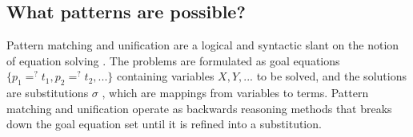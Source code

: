 \documentclass[sigconf]{acmart}
\begin{document}
 
 

















\subsection{What patterns are possible?} \label{patternpossible}

Pattern matching and unification are a logical and syntactic slant on the notion of equation solving \cite{traatbook} \cite{BAADER2001445}. The problems are formulated as goal equations $\{p_1 =^? t_1, p_2 =^? t_2, ...\}$ containing variables $X, Y,...$ to be solved, and the solutions are substitutions $\sigma$ , which are mappings from variables to terms. Pattern matching and unification operate as backwards reasoning methods that breaks down the goal equation set until it is refined into a substitution.
\end{document}
